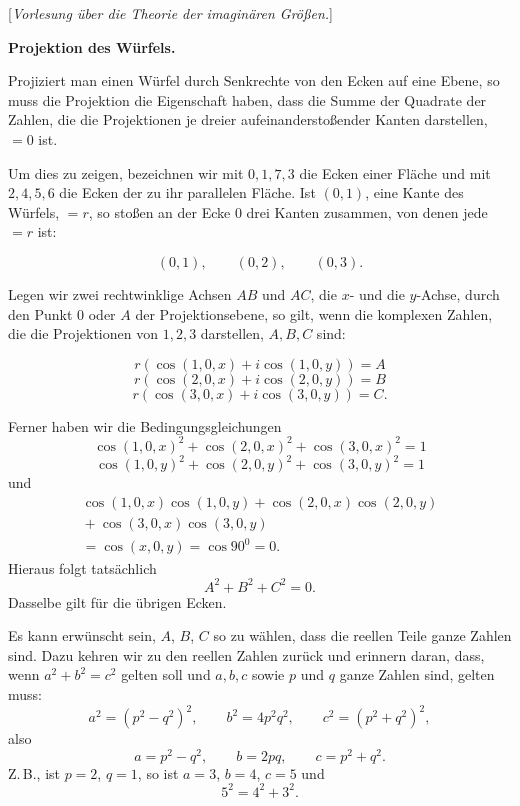 \clearpage{}

\begin{center}[\emph{Vorlesung über die Theorie der imaginären Größen.}]\end{center}

\begin{center}\bfseries Projektion des Würfels.\end{center}

Projiziert man einen Würfel durch Senkrechte von den Ecken auf eine Ebene, so muss die Projektion die Eigenschaft haben, dass die Summe der Quadrate der Zahlen, die die Projektionen je dreier aufeinanderstoßender Kanten darstellen, $=0$ ist.

Um dies zu zeigen, bezeichnen wir mit $0,1,7,3$ die Ecken einer Fläche und mit $2,4,5,6$ die Ecken der zu ihr parallelen Fläche. Ist $(0,1)$, eine Kante des Würfels, $=r$, so stoßen an der Ecke $0$ drei Kanten zusammen, von denen jede $=r$ ist:

\begin{center}\end{center}

\[
(0,1),\qquad (0,2),\qquad (0,3).
\]

Legen wir zwei rechtwinklige Achsen $AB$ und $AC$, die $x$- und die $y$-Achse, durch den Punkt $0$ oder $A$ der Projektionsebene, so gilt, wenn die komplexen Zahlen, die die Projektionen von $1,2,3$ darstellen, $A,B,C$ sind:

\begin{center}\begin{minipage}{5.2cm}\end{minipage}\hspace{.3cm}\begin{minipage}{7.2cm}

\[
r(\cos(1,0,x)+i\cos(1,0,y)) = A
\]
\[
r(\cos(2,0,x)+i\cos(2,0,y)) = B
\]
\[
r(\cos(3,0,x)+i\cos(3,0,y)) = C.
\]
\end{minipage}\end{center}
Ferner haben wir die Bedingungsgleichungen
\[
\cos(1,0,x)^2+\cos(2,0,x)^2+\cos(3,0,x)^2 = 1
\]
\[
\cos(1,0,y)^2+\cos(2,0,y)^2+\cos(3,0,y)^2 = 1
\]
und
\[
\begin{gathered}\cos(1,0,x)\cos(1,0,y)+\cos(2,0,x)\cos(2,0,y)\\{}+\cos(3,0,x)\cos(3,0,y)\\{}=\cos(x,0,y)=\cos 90^0=0.\end{gathered}
\]
Hieraus folgt tatsächlich
\[
A^2+B^2+C^2=0.
\]
Dasselbe gilt für die übrigen Ecken.

Es kann erwünscht sein, $A$, $B$, $C$ so zu wählen, dass die reellen Teile ganze Zahlen sind. Dazu kehren wir zu den reellen Zahlen zurück und erinnern daran, dass, wenn $a^2+b^2=c^2$ gelten soll und $a,b,c$ sowie $p$ und $q$ ganze Zahlen sind, gelten muss:
\[
a^2=(p^2-q^2)^2,\qquad b^2=4p^2q^2,\qquad c^2=(p^2+q^2)^2,
\]
also
\[
a=p^2-q^2,\qquad b=2pq,\qquad c=p^2+q^2.
\]
Z.\,B., ist $p=2$, $q=1$, so ist $a=3$, $b=4$, $c=5$ und
\[
5^2=4^2+3^2.
\]
